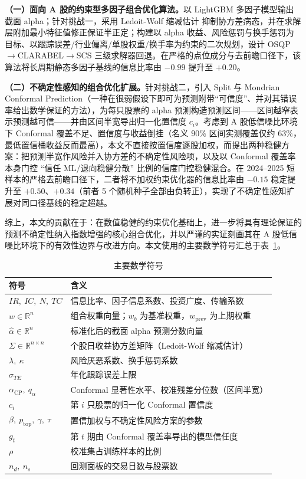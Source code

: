 \textbf{（一）面向 A 股的约束型多因子组合优化算法。}以 LightGBM\cite{Ke2017LightGBM} 多因子模型输出截面 alpha；针对挑战一，采用 Ledoit-Wolf 缩减估计\cite{Ledoit2004} 抑制协方差病态，并在求解层附加最小特征值修正保证半正定；构建以 alpha 收益、风险惩罚与换手惩罚为目标、以跟踪误差/行业偏离/单股权重/换手率为约束的二次规划，设计 OSQP$\to$CLARABEL$\to$SCS 三级求解器回退。在严格的点位成分与去前瞻口径下，该算法将长周期静态多因子基线的信息比率由 $-0.99$ 提升至 $+0.20$。

\textbf{（二）不确定性感知的组合优化扩展。}针对挑战二，引入 Split 与 Mondrian Conformal Prediction\cite{Vovk2005Conformal,Romano2019CQR,Angelopoulos2021Gentle}（一种在很弱假设下即可为预测附带``可信度''、并对其错误率给出数学保证的方法），为每只股票的 alpha 预测构造预测区间——区间越窄表示预测越可信——并由区间半宽导出归一化置信度 $c_i$。考虑到 A 股低信噪比环境下 Conformal 覆盖不足、置信度与收益倒挂（名义 $90\%$ 区间实测覆盖仅约 $63\%$，最低置信桶收益反而最高），本文不直接按置信度逐股加权，而提出两种稳健方案：把预测半宽作风险并入协方差的不确定性风险项，以及以 Conformal 覆盖率本身门控 ``信任 ML/退向稳健分散'' 比例的信度门控稳健混合。在 2024--2025 短样本的严格去前瞻口径下，二者将不加权约束优化器的信息比率由 $-0.15$ 稳定提升至 $+0.50$、$+0.34$（前者 5 个随机种子全部由负转正），实现了不确定性感知扩展对同口径基线的稳定超越。

综上，本文的贡献在于：在数值稳健的约束优化基础上，进一步将具有理论保证的预测不确定性纳入指数增强的核心组合优化，并以严谨的实证刻画其在 A 股低信噪比环境下的有效性边界与改进方向。本文使用的主要数学符号汇总于表~\ref{tab:symbols}。

\begin{table}[htbp]
\centering
\caption{主要数学符号}
\label{tab:symbols}
\begin{tabular}{ll}
\toprule
\textbf{符号} & \textbf{含义} \\
\midrule
$IR,\ IC,\ N,\ TC$ & 信息比率、因子信息系数、投资广度、传输系数 \\
$w\in\mathbb{R}^n$ & 组合权重向量；$w_b$ 为基准权重，$w_{\text{prev}}$ 为上期权重 \\
$\hat\alpha\in\mathbb{R}^n$ & 标准化后的截面 alpha 预测分数向量 \\
$\Sigma\in\mathbb{R}^{n\times n}$ & 个股日收益协方差矩阵（Ledoit-Wolf 缩减估计） \\
$\lambda,\ \kappa$ & 风险厌恶系数、换手惩罚系数 \\
$\sigma_{TE}$ & 年化跟踪误差上限 \\
$\alpha_{\text{CP}},\ q_{\alpha}$ & Conformal 显著性水平、校准残差分位数（区间半宽） \\
$c_i$ & 第 $i$ 只股票的归一化 Conformal 置信度 \\
$\beta,\ p_{\text{top}},\ \gamma,\ \tau$ & 置信加权与不确定性风险方案的参数 \\
$g_t$ & 第 $t$ 期由 Conformal 覆盖率导出的模型信任度 \\
$\rho$ & 校准集占训练样本的比例 \\
$n_d,\ n_s$ & 回测面板的交易日数与股票数 \\
\bottomrule
\end{tabular}
\end{table}

